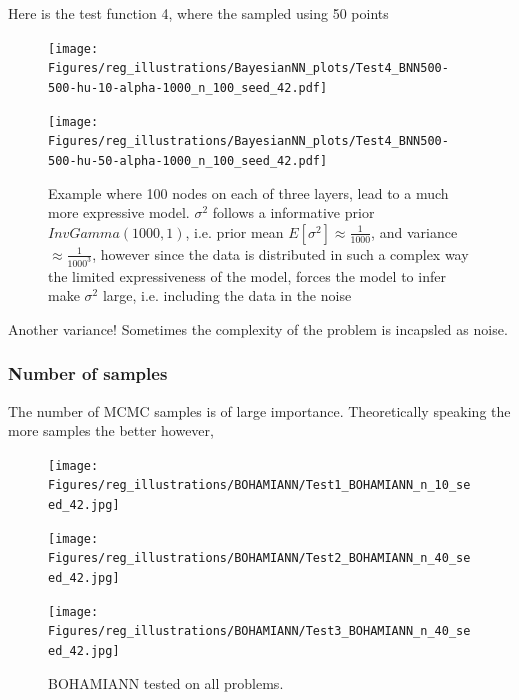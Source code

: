 Here is the test function 4, where the sampled using 50 points
\begin{figure}[h]
    \centering
    \begin{minipage}[b]{0.49\textwidth}
     \texttt{[image: Figures/reg\_illustrations/BayesianNN\_plots/Test4\_BNN500-500-hu-10-alpha-1000\_n\_100\_seed\_42.pdf]}
    \end{minipage}
    \hfill
    \begin{minipage}[b]{0.49\textwidth}
      \texttt{[image: Figures/reg\_illustrations/BayesianNN\_plots/Test4\_BNN500-500-hu-50-alpha-1000\_n\_100\_seed\_42.pdf]}
     \end{minipage}
     \caption{Example where 100 nodes on each of three layers, lead to a much more expressive model.
     $\sigma^2$ follows a informative prior $InvGamma(1000,1)$, i.e. prior mean $E[\sigma^2] \approx
     \frac{1}{1000}$, and variance $\approx \frac{1}{1000^3}$, however since the data is distributed in such 
     a complex way the limited expressiveness of the model, forces the model to infer make $\sigma^2$ large, 
     i.e. including the data in the noise}
\end{figure}

Another variance! Sometimes the complexity of the problem is incapsled as noise.


\subsubsection{Number of samples}
The number of MCMC samples is of large importance. Theoretically speaking the more samples the better
however, 


\begin{figure}[h]
    \centering
    \begin{minipage}[b]{0.32\textwidth}
     \texttt{[image: Figures/reg\_illustrations/BOHAMIANN/Test1\_BOHAMIANN\_n\_10\_seed\_42.jpg]}
    \end{minipage}
    \hfill
    \begin{minipage}[b]{0.32\textwidth}
      \texttt{[image: Figures/reg\_illustrations/BOHAMIANN/Test2\_BOHAMIANN\_n\_40\_seed\_42.jpg]}
     \end{minipage}
     \hfill
     \begin{minipage}[b]{0.32\textwidth}
      \texttt{[image: Figures/reg\_illustrations/BOHAMIANN/Test3\_BOHAMIANN\_n\_40\_seed\_42.jpg]}
     \end{minipage}
      \caption{BOHAMIANN tested on all problems.}
\end{figure}


